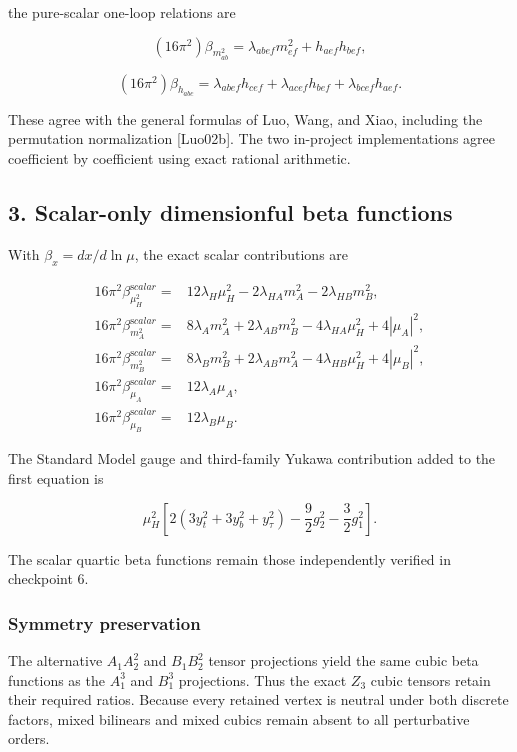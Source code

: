 \documentclass[
]{article}
\begin{document}
the pure-scalar one-loop relations are

\[
(16\pi^2)\beta_{m^2_{ab}}
=\lambda_{abef}m^2_{ef}+h_{aef}h_{bef},
\]

\[
(16\pi^2)\beta_{h_{abc}}
=\lambda_{abef}h_{cef}+\lambda_{acef}h_{bef}+\lambda_{bcef}h_{aef}.
\]

These agree with the general formulas of Luo, Wang, and Xiao, including
the permutation normalization {[}Luo02b{]}. The two in-project
implementations agree coefficient by coefficient using exact rational
arithmetic.

\hypertarget{scalar-only-dimensionful-beta-functions}{%
\subsection{3. Scalar-only dimensionful beta
functions}\label{scalar-only-dimensionful-beta-functions}}

With \(\beta_x=dx/d\ln\mu\), the exact scalar contributions are

\[
\begin{aligned}
16\pi^2\beta_{\mu_H^2}^{\mathrm scalar}
={}&12\lambda_H\mu_H^2-2\lambda_{HA}m_A^2-2\lambda_{HB}m_B^2,\\
16\pi^2\beta_{m_A^2}^{\mathrm scalar}
={}&8\lambda_A m_A^2+2\lambda_{AB}m_B^2-4\lambda_{HA}\mu_H^2+4|\mu_A|^2,\\
16\pi^2\beta_{m_B^2}^{\mathrm scalar}
={}&8\lambda_B m_B^2+2\lambda_{AB}m_A^2-4\lambda_{HB}\mu_H^2+4|\mu_B|^2,\\
16\pi^2\beta_{\mu_A}^{\mathrm scalar}
={}&12\lambda_A\mu_A,\\
16\pi^2\beta_{\mu_B}^{\mathrm scalar}
={}&12\lambda_B\mu_B.
\end{aligned}
\]

The Standard Model gauge and third-family Yukawa contribution added to
the first equation is

\[
\mu_H^2\left[2(3y_t^2+3y_b^2+y_\tau^2)-\frac92g_2^2-\frac32g_1^2\right].
\]

The scalar quartic beta functions remain those independently verified in
checkpoint 6.

\hypertarget{symmetry-preservation}{%
\subsubsection{Symmetry preservation}\label{symmetry-preservation}}

The alternative \(A_1A_2^2\) and \(B_1B_2^2\) tensor projections yield
the same cubic beta functions as the \(A_1^3\) and \(B_1^3\)
projections. Thus the exact \(Z_3\) cubic tensors retain their required
ratios. Because every retained vertex is neutral under both discrete
factors, mixed bilinears and mixed cubics remain absent to all
perturbative orders.
\end{document}
